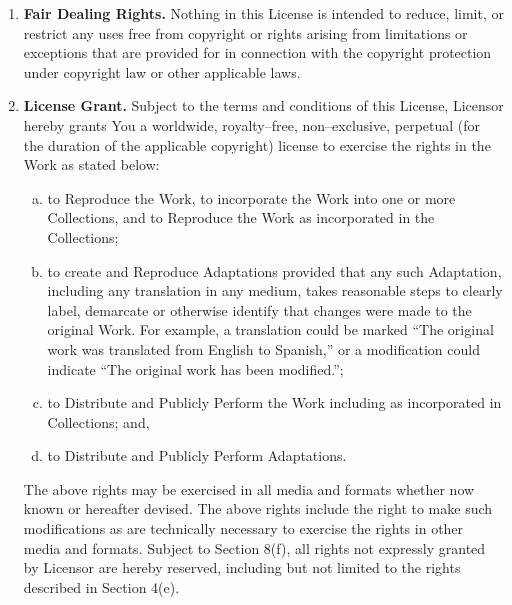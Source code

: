 \documentclass[12pt,letterpaper,oneside,final]{memoir}
\begin{document}
\begin{appendices}
\begin{enumerate}[1.]
\begin{enumerate}[a.]
   \end{enumerate}
\item \textbf{Fair Dealing Rights.} Nothing in this License is intended to reduce, limit, or restrict any uses free from copyright or rights arising from limitations or exceptions that are provided for in connection with the copyright protection under copyright law or other applicable laws.
\item \textbf{License Grant.} Subject to the terms and conditions of this License, Licensor hereby grants You a worldwide, royalty--free, non--exclusive, perpetual (for the duration of the applicable copyright) license to exercise the rights in the Work as stated below:
   \begin{enumerate}[a.]
   \item to Reproduce the Work, to incorporate the Work into one or more Collections, and to Reproduce the Work as incorporated in the Collections;
   \item to create and Reproduce Adaptations provided that any such Adaptation, including any translation in any medium, takes reasonable steps to clearly label, demarcate or otherwise identify that changes were made to the original Work. For example, a translation could be marked ``The original work was translated from English to Spanish,'' or a modification could indicate ``The original work has been modified.'';
   \item to Distribute and Publicly Perform the Work including as incorporated in Collections; and,
   \item to Distribute and Publicly Perform Adaptations.
   \end{enumerate}

The above rights may be exercised in all media and formats whether now known or hereafter devised. The above rights include the right to make such modifications as are technically necessary to exercise the rights in other media and formats. Subject to Section 8(f), all rights not expressly granted by Licensor are hereby reserved, including but not limited to the rights described in Section 4(e).


\end{enumerate}
\end{appendices}
\end{document}
